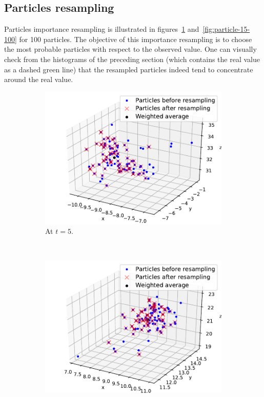 \documentclass[english, DIV=13]{scrartcl}
\begin{document}
\subsection{Particles resampling}
Particles importance resampling is illustrated in figures~\ref{fig:particle-5-100}
and~\ref{fig:particle-15-100} for 100 particles. The objective of this importance
resampling is to choose the most probable particles with respect to the observed
value. One can visually check from the histograms of the preceding section (which
contains the real value as a dashed green line) that the resampled particles indeed tend
to concentrate around the real value.

\begin{figure}
    \centering
    \begin{subfigure}{0.49\textwidth}
        \includegraphics[width=\textwidth]{figures/particles-5-100}
        \caption{At $t=5$.}
        \label{fig:particle-5-100}
    \end{subfigure}%
    ~
    \begin{subfigure}{0.49\textwidth}
        \includegraphics[width=\textwidth]{figures/particles-15-100}

\end{subfigure}
\end{figure}
\end{document}
